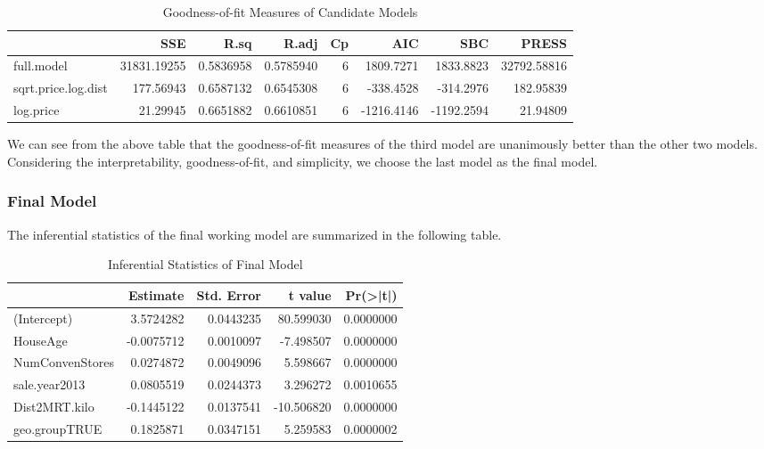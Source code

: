 \documentclass[
]{book}
\newenvironment{Shaded}{\begin{snugshade}}{\end{snugshade}}
\newcommand{\AttributeTok}[1]{\textcolor[rgb]{0.13,0.29,0.53}{#1}}
\newcommand{\FunctionTok}[1]{\textcolor[rgb]{0.13,0.29,0.53}{\textbf{#1}}}
\newcommand{\NormalTok}[1]{#1}
\newcommand{\SpecialCharTok}[1]{\textcolor[rgb]{0.81,0.36,0.00}{\textbf{#1}}}
\newcommand{\StringTok}[1]{\textcolor[rgb]{0.31,0.60,0.02}{#1}}
\begin{document}
\begin{table}

\caption{\label{tab:unnamed-chunk-90}Goodness-of-fit Measures of Candidate Models}
\centering
\begin{tabular}[t]{l|r|r|r|r|r|r|r}
\hline
  & SSE & R.sq & R.adj & Cp & AIC & SBC & PRESS\\
\hline
full.model & 31831.19255 & 0.5836958 & 0.5785940 & 6 & 1809.7271 & 1833.8823 & 32792.58816\\
\hline
sqrt.price.log.dist & 177.56943 & 0.6587132 & 0.6545308 & 6 & -338.4528 & -314.2976 & 182.95839\\
\hline
log.price & 21.29945 & 0.6651882 & 0.6610851 & 6 & -1216.4146 & -1192.2594 & 21.94809\\
\hline
\end{tabular}
\end{table}

We can see from the above table that the goodness-of-fit measures of the third model are unanimously better than the other two models. Considering the interpretability, goodness-of-fit, and simplicity, we choose the last model as the final model.

\hypertarget{final-model}{%
\subsubsection{Final Model}\label{final-model}}

The inferential statistics of the final working model are summarized in the following table.

\begin{Shaded}
\end{Shaded}

\begin{table}

\caption{\label{tab:unnamed-chunk-91}Inferential Statistics of Final Model}
\centering
\begin{tabular}[t]{l|r|r|r|r}
\hline
  & Estimate & Std. Error & t value & Pr(>|t|)\\
\hline
(Intercept) & 3.5724282 & 0.0443235 & 80.599030 & 0.0000000\\
\hline
HouseAge & -0.0075712 & 0.0010097 & -7.498507 & 0.0000000\\
\hline
NumConvenStores & 0.0274872 & 0.0049096 & 5.598667 & 0.0000000\\
\hline
sale.year2013 & 0.0805519 & 0.0244373 & 3.296272 & 0.0010655\\
\hline
Dist2MRT.kilo & -0.1445122 & 0.0137541 & -10.506820 & 0.0000000\\
\hline
geo.groupTRUE & 0.1825871 & 0.0347151 & 5.259583 & 0.0000002\\
\hline
\end{tabular}
\end{table}
\end{document}
